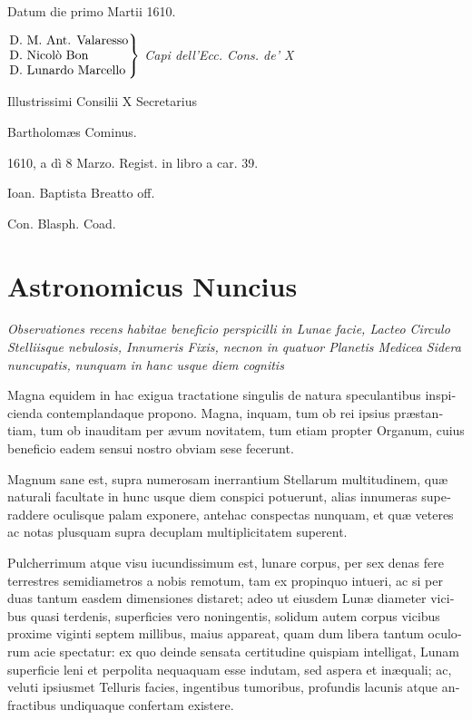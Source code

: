 \documentclass[11pt,twoside,openany]{book}
\begin{document}
\begin{otherlanguage}{latin}
Datum die primo Martii 1610.

\begin{center}
$\left.\begin{tabular}{@{}l@{}}
D. M. Ant. Valaresso \\
D. Nicolò Bon \\
D. Lunardo Marcello
\end{tabular}\right\}$ \textit{Capi dell'Ecc. Cons. de' X}
\end{center}

Illustrissimi Consilii X Secretarius

Bartholomæs Cominus.

1610, a dì 8 Marzo. Regist. in libro a car. 39.

Ioan. Baptista Breatto off.

Con. Blasph. Coad.

\chapter{Astronomicus Nuncius}
\begin{center}
{\itshape Observationes recens habitae beneficio perspicilli in Lunae facie, Lacteo Circulo Stelliisque nebulosis, Innumeris Fixis, necnon in quatuor Planetis Medicea Sidera nuncupatis, nunquam in hanc usque diem cognitis\par}
\end{center}
\bigskip

Magna equidem in hac exigua tractatione singulis de natura speculantibus inspicienda contemplandaque propono. Magna, inquam, tum ob rei ipsius præstantiam, tum ob inauditam per ævum novitatem, tum etiam propter Organum, cuius beneficio eadem sensui nostro obviam sese fecerunt.

Magnum sane est, supra numerosam inerrantium Stellarum multitudinem, quæ naturali facultate in hunc usque diem conspici potuerunt, alias innumeras superaddere oculisque palam exponere, antehac conspectas nunquam, et quæ veteres ac notas plusquam supra decuplam multiplicitatem superent.

Pulcherrimum atque visu iucundissimum est, lunare corpus, per sex denas fere terrestres semidiametros\textsc{ }a nobis remotum, tam ex propinquo intueri, ac si per duas tantum easdem dimensiones distaret; adeo ut eiusdem Lunæ diameter vicibus quasi terdenis, superficies vero noningentis, solidum autem corpus vicibus proxime viginti septem millibus, maius appareat, quam dum libera tantum oculorum acie spectatur: ex quo deinde sensata certitudine quispiam intelligat, Lunam superficie leni et perpolita nequaquam esse indutam, sed aspera et inæquali; ac, veluti ipsiusmet Telluris facies, ingentibus tumoribus, profundis lacunis atque anfractibus undiquaque confertam existere.


\end{otherlanguage}
\end{document}
